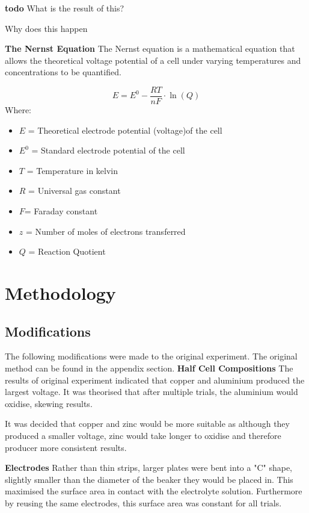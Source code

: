 \documentclass[11pt,a4paper]{article}
\begin{document}
	\textbf{todo}\newline
	What is the result of this?
	
	Why does this happen


	\textbf{The Nernst Equation}\newline
	The Nernst equation is a mathematical equation that allows the theoretical voltage potential of a cell under varying temperatures and concentrations to be quantified.
	
	$$
	E=E^0 - \frac{RT}{nF}\cdot \ln(Q)
	$$
	Where:
	\begin{itemize}
		\item $E$ = Theoretical electrode potential (voltage)of the cell
		\item $E^0$ = Standard electrode potential of the cell
		\item $T$ = Temperature in kelvin 
		\item $R$ = Universal gas constant
		\item $F$= Faraday constant
		\item $z$ = Number of moles of electrons transferred
		\item $Q$ = Reaction Quotient
		
	\end{itemize}
\section{Methodology}
\subsection{Modifications}

The following modifications were made to the original experiment. The original method can be found in the appendix section.\newline
\textbf{Half Cell Compositions}\newline
The results of original experiment indicated that copper and aluminium produced the largest voltage. It was theorised that after multiple trials, the aluminium would oxidise, skewing results.

It was decided that copper and zinc would be more suitable as although they produced a smaller voltage, zinc would take longer to oxidise and therefore producer more consistent results.

\textbf{Electrodes}\newline
Rather than thin strips, larger plates were bent into a "C" shape, slightly smaller than the diameter of the beaker they would be placed in. This maximised the surface area in contact with the electrolyte solution. Furthermore by reusing the same electrodes, this surface area was constant for all trials.
\end{document}
